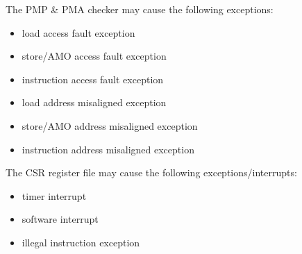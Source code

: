 The PMP \& PMA checker may cause the following exceptions:
\begin{itemize}
	\item load access fault exception
	\item store/AMO access fault exception
	\item instruction access fault exception
	\item load address misaligned exception
	\item store/AMO address misaligned exception
	\item instruction address misaligned exception
\end{itemize}

The CSR register file may cause the following exceptions/interrupts:
\begin{itemize}
	\item timer interrupt
	\item software interrupt
	\item illegal instruction exception
\end{itemize}
